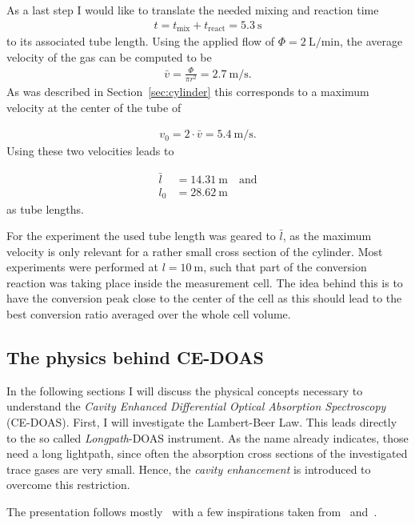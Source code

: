 As a last step I would like to translate the needed mixing and reaction
time
\begin{align*}
  t = t_{\text{mix}} + t_{\text{react}} = \SI{5.3}{\second}
\end{align*}
to its associated tube length. Using the applied flow of
$\Phi = \SI{2}{\liter\per\minute}$, the average velocity of the gas
can be computed to be
\begin{align*}
  \bar v = \frac{\Phi}{\pi r^2} = \SI{2.7}{\meter\per\second}. 
\end{align*}
As was described in Section~\ref{sec:cylinder} this corresponds to a
maximum velocity at the center of the tube of

\begin{align*}
  v_0 = 2\cdot \bar v = \SI{5.4}{\meter\per\second}.
\end{align*}
Using these two velocities leads to

\begin{align*}
  \bar l & = \SI{14.31}{\meter} \quad \text{and}\\
  l_0 & = \SI{28.62}{\meter}
\end{align*}
as tube lengths.

For the experiment the used tube length was geared to $\bar l$, as the
maximum velocity is only relevant for a rather small cross section of
the cylinder. Most experiments were performed at
$l = \SI{10}{\meter}$, such that part of the conversion reaction was
taking place inside the measurement cell. The idea behind this is to have the
conversion peak close to the center of the cell as this should lead
to the best conversion ratio averaged over the whole cell volume.

\subsection{The physics behind CE-DOAS}
\label{sec:ce-doas-physics}

In the following sections I will discuss the physical concepts
necessary to understand the \emph{Cavity Enhanced Differential Optical
  Absorption Spectroscopy} (CE-DOAS). First, I will investigate the
Lambert-Beer Law. This leads directly to the so called
\emph{Longpath}-DOAS instrument. As the name already indicates, those
need a long lightpath, since often the absorption cross sections of
the investigated trace gases are very small. Hence, the \emph{cavity
  enhancement} is introduced to overcome this restriction.

The presentation follows mostly~\cite{fp58} with a few inspirations
taken from~\cite{bsc} and~\cite{platt}.


